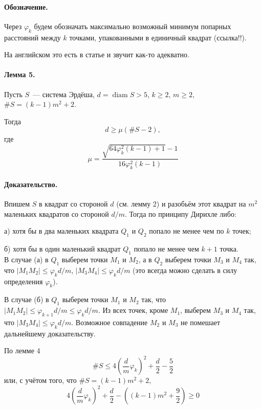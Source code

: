 \paragraph{Обозначение.}
Через $\varphi_k$ будем обозначать максимально возможный минимум попарных расстояний между $k$ точками,
упакованными в единичный квадрат (ссылка!!).

На английском это есть в статье и звучит как-то адекватно.

\paragraph{Лемма 5.}
Пусть $S$~--- система Эрдёша,
$d = \mathop{diam} S > 5$,
$k \geq 2$,
$m \geq 2$,
$ \#S = (k-1)m^2 + 2$.

Тогда
\begin{equation}
	d \geq \mu (\#S - 2),
\end{equation}
где
\begin{equation}
	\mu = \frac{\sqrt{64\varphi_k^2 (k-1)+1}-1}{16\varphi_k^2 (k-1)}
\end{equation}

\paragraph{Доказательство.}
Впишем $S$ в квадрат со стороной $d$ (см. лемму 2)
и разобьём этот квадрат на $m^2$ маленьких квадратов со стороной $d/m$.
Тогда по принципу Дирихле либо:

а) хотя бы в два маленьких квадрата $Q_1$ и $Q_2$ попало не менее чем по $k$ точек;

б) хотя бы в один маленький квадрат $Q_1$ попало не менее чем $k+1$ точка.
\\
В случае (а) в $Q_1$ выберем точки $M_1$ и $M_2$,
а в $Q_2$ выберем точки $M_3$ и $M_4$
так, что $|M_1 M_2| \leq \varphi_k d /m$, $|M_3 M_4| \leq \varphi_k d/m$
(это всегда можно сделать в силу определения $\varphi_k$).

В случае (б) в $Q_1$ выберем точки $M_1$ и $M_2$ так, что
$|M_1 M_2| \leq \varphi_{k+1} d /m \leq \varphi_k d /m$.
Из всех точек, кроме $M_1$, выберем $M_3$ и $M_4$ так, что
$|M_3 M_4| \leq \varphi_k d/m$.
Возможное совпадение $M_2$ и $M_3$ не помешает дальнейшему доказательству.

По лемме 4
\begin{equation}
	\#S \leq 4 \left( \frac{d}{m} \varphi_k \right)^2 + \frac{d}{2} - \frac{5}{2}
\end{equation}
или, с учётом того, что $ \#S = (k-1)m^2 + 2$,
\begin{equation}
	 4 \left( \frac{d}{m} \varphi_k \right)^2 + \frac{d}{2} - \left( (k-1)m^2 + \frac{9}{2}\right) \geq 0
\end{equation}

